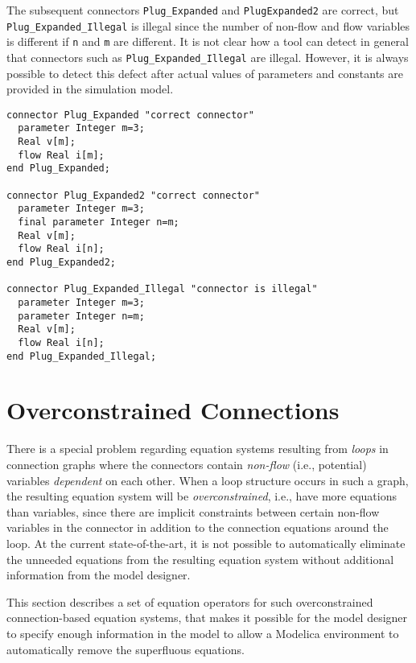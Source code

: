 \begin{example}
The subsequent connectors \lstinline!Plug_Expanded! and \lstinline!PlugExpanded2! are correct, but \lstinline!Plug_Expanded_Illegal! is illegal since the number of non-flow and flow variables is different if \lstinline!n! and \lstinline!m! are different.
It is not clear how a tool can detect in general that connectors such as \lstinline!Plug_Expanded_Illegal! are illegal.
However, it is always possible to detect this defect after actual values of parameters and constants are provided in the simulation model.

\begin{lstlisting}[language=modelica]
connector Plug_Expanded "correct connector"
  parameter Integer m=3;
  Real v[m];
  flow Real i[m];
end Plug_Expanded;

connector Plug_Expanded2 "correct connector"
  parameter Integer m=3;
  final parameter Integer n=m;
  Real v[m];
  flow Real i[n];
end Plug_Expanded2;

connector Plug_Expanded_Illegal "connector is illegal"
  parameter Integer m=3;
  parameter Integer n=m;
  Real v[m];
  flow Real i[n];
end Plug_Expanded_Illegal;
\end{lstlisting}
\end{example}

\section{Overconstrained Connections}\label{equation-operators-for-overconstrained-connection-based-equation-systems1}\label{overconstrained-connections}

There is a special problem regarding equation systems resulting from \emph{loops} in connection graphs where the connectors contain \emph{non-flow} (i.e., potential) variables \emph{dependent} on each other.
When a loop structure occurs in such a graph, the resulting equation system will be \emph{overconstrained}, i.e., have more equations than variables, since there are implicit constraints between certain non-flow variables in the connector in addition to the connection equations around the loop.
At the current state-of-the-art, it is not possible to automatically eliminate the unneeded equations from the resulting equation system without additional information from the model designer.

This section describes a set of equation operators for such overconstrained connection-based equation systems, that makes it possible for the model designer to specify enough information in the model to allow a Modelica environment to automatically remove the superfluous equations.

